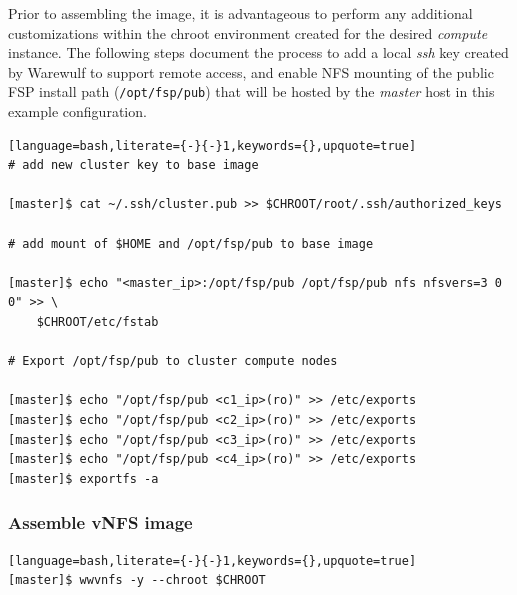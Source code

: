 \documentclass[letterpaper]{article}
\begin{document}
Prior to assembling the image, it is advantageous to perform any additional
customizations within the chroot environment created for the desired {\em
  compute} instance. The following steps document the process to add a local
{\em ssh} key created by Warewulf to support remote access, and enable NFS
mounting of the public FSP install path (\texttt{/opt/fsp/pub}) that will be
hosted by the {\em master} host in this example configuration. \\

\begin{lstlisting}[language=bash,literate={-}{-}1,keywords={},upquote=true]
# add new cluster key to base image

[master]$ cat ~/.ssh/cluster.pub >> $CHROOT/root/.ssh/authorized_keys

# add mount of $HOME and /opt/fsp/pub to base image

[master]$ echo "<master_ip>:/opt/fsp/pub /opt/fsp/pub nfs nfsvers=3 0 0" >> \
    $CHROOT/etc/fstab

# Export /opt/fsp/pub to cluster compute nodes

[master]$ echo "/opt/fsp/pub <c1_ip>(ro)" >> /etc/exports
[master]$ echo "/opt/fsp/pub <c2_ip>(ro)" >> /etc/exports
[master]$ echo "/opt/fsp/pub <c3_ip>(ro)" >> /etc/exports
[master]$ echo "/opt/fsp/pub <c4_ip>(ro)" >> /etc/exports
[master]$ exportfs -a
\end{lstlisting}


\subsubsection{Assemble vNFS image}

\begin{lstlisting}[language=bash,literate={-}{-}1,keywords={},upquote=true]
[master]$ wwvnfs -y --chroot $CHROOT
\end{lstlisting}




\end{document}
